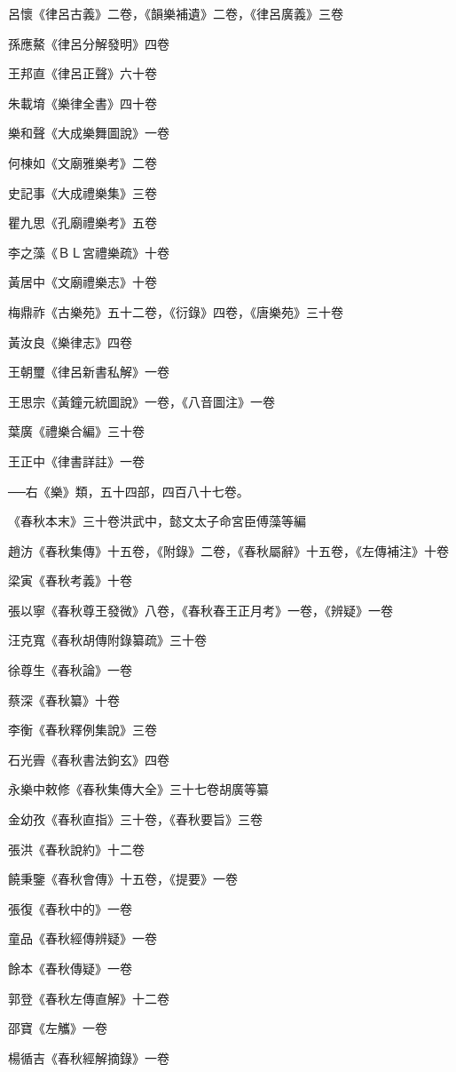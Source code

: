 呂懷《律呂古義》二卷，《韻樂補遺》二卷，《律呂廣義》三卷

孫應鰲《律呂分解發明》四卷

王邦直《律呂正聲》六十卷

朱載堉《樂律全書》四十卷

樂和聲《大成樂舞圖說》一卷

何棟如《文廟雅樂考》二卷

史記事《大成禮樂集》三卷

瞿九思《孔廟禮樂考》五卷

李之藻《ＢＬ宮禮樂疏》十卷

黃居中《文廟禮樂志》十卷

梅鼎祚《古樂苑》五十二卷，《衍錄》四卷，《唐樂苑》三十卷

黃汝良《樂律志》四卷

王朝璽《律呂新書私解》一卷

王思宗《黃鐘元統圖說》一卷，《八音圖注》一卷

葉廣《禮樂合編》三十卷

王正中《律書詳註》一卷

──右《樂》類，五十四部，四百八十七卷。

《春秋本末》三十卷洪武中，懿文太子命宮臣傅藻等編

趙汸《春秋集傳》十五卷，《附錄》二卷，《春秋屬辭》十五卷，《左傳補注》十卷

梁寅《春秋考義》十卷

張以寧《春秋尊王發微》八卷，《春秋春王正月考》一卷，《辨疑》一卷

汪克寬《春秋胡傳附錄纂疏》三十卷

徐尊生《春秋論》一卷

蔡深《春秋纂》十卷

李衡《春秋釋例集說》三卷

石光霽《春秋書法鉤玄》四卷

永樂中敕修《春秋集傳大全》三十七卷胡廣等纂

金幼孜《春秋直指》三十卷，《春秋要旨》三卷

張洪《春秋說約》十二卷

饒秉鑒《春秋會傳》十五卷，《提要》一卷

張復《春秋中的》一卷

童品《春秋經傳辨疑》一卷

餘本《春秋傳疑》一卷

郭登《春秋左傳直解》十二卷

邵寶《左觿》一卷

楊循吉《春秋經解摘錄》一卷

